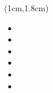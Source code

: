 \begin{frame}
\begin{overlayarea}{\textwidth}{3cm}

\end{overlayarea}

\begin{center}
\begin{textblock*}{0.6\textwidth}(1cm,1.8cm)
\begin{itemize} \englishfont
	\item[\ding{111}]  {\color{cqublue}{VCPS 质量模型}}
	\item
	\item
	\item
	\item
	\item[\ding{111}]  {\color{cqublue}{VCPS开销模型}}
\end{itemize}
\end{textblock*}
\end{center}

\end{frame}

